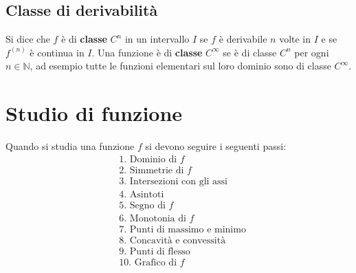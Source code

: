\documentclass{book}
\begin{document}
\begin{definition}
    \subsection{Classe di derivabilità}
    Si dice che \( f \) è di \textbf{classe} \( C^n \) in un intervallo \( I \) se \( f \) è derivabile \( n \) volte in \( I \) e se \( f^{(n)} \) è continua in \( I \).
    Una funzione è di \textbf{classe} \( C^{\infty} \) se è di classe \( C^n \) per ogni \( n \in \mathbb{N} \), ad esempio tutte le funzioni elementari sul loro dominio sono di classe \( C^{\infty} \).
\end{definition}
\noindent\begin{minipage}{\textwidth}
    \section{Studio di funzione}
    \begin{proposition}
        Quando si studia una funzione \(f\) si devono seguire i seguenti passi:
        \begin{align*}
             & \text{1. } \text{Dominio di \(f\)}          \\
             & \text{2. } \text{Simmetrie di \(f\)}        \\
             & \text{3. } \text{Intersezioni con gli assi} \\
             & \text{4. } \text{Asintoti}                  \\
             & \text{5. } \text{Segno di \(f\)}            \\
             & \text{6. } \text{Monotonia di \(f\)}        \\
             & \text{7. } \text{Punti di massimo e minimo} \\
             & \text{8. } \text{Concavità e convessità}    \\
             & \text{9. } \text{Punti di flesso}           \\
             & \text{10. } \text{Grafico di \(f\)}
        \end{align*}
    \end{proposition}
\end{minipage}
\end{document}
